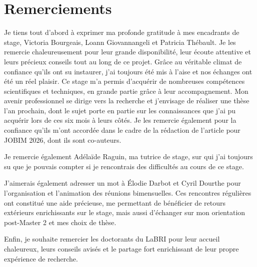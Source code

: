 \section*{Remerciements}

Je tiens tout d'abord à exprimer ma profonde gratitude à mes encadrants de stage, Victoria Bourgeais, Loann Giovannangeli et Patricia Thébault. Je les remercie chaleureusement pour leur grande disponibilité, leur écoute attentive et leurs précieux conseils tout au long de ce projet. Grâce au véritable climat de confiance qu'ils ont su instaurer, j'ai toujours été mis à l'aise et nos échanges ont été un réel plaisir. Ce stage m'a permis d'acquérir de nombreuses compétences scientifiques et techniques, en grande partie grâce à leur accompagnement. Mon avenir professionnel se dirige vers la recherche et j'envisage de réaliser une thèse l'an prochain, dont le sujet porte en partie sur les connaissances que j'ai pu acquérir lors de ces six mois à leurs côtés. Je les remercie également pour la confiance qu'ils m'ont accordée dans le cadre de la rédaction de l'article pour JOBIM 2026, dont ils sont co-auteurs.

\vspace{0.6cm}

Je remercie également Adélaïde Raguin, ma tutrice de stage, sur qui j'ai toujours su que je pouvais compter si je rencontrais des difficultés au cours de ce stage.

\vspace{0.6cm}

J'aimerais également adresser un mot à Élodie Darbot et Cyril Dourthe pour l'organisation et l'animation des réunions bimensuelles. Ces rencontres régulières ont constitué une aide précieuse, me permettant de bénéficier de retours extérieurs enrichissants sur le stage, mais aussi d'échanger sur mon orientation post-Master 2 et mes choix de thèse.

\vspace{0.6cm}

Enfin, je souhaite remercier les doctorants du LaBRI pour leur accueil chaleureux, leurs conseils avisés et le partage fort enrichissant de leur propre expérience de recherche.
